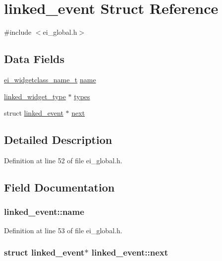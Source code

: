 \hypertarget{structlinked__event}{
\section{linked\_\-event Struct Reference}
\label{structlinked__event}
}


{\ttfamily \#include $<$ei\_\-global.h$>$}\subsection*{Data Fields}
\begin{DoxyCompactItemize}
\item 
\hyperlink{ei__widgetclass_8h_acfa18ebbfac8cbbc11345a01c2099aed}{ei\_\-widgetclass\_\-name\_\-t} \hyperlink{structlinked__event_ab7d51453c09d34e54477daf1b22754c5}{name}
\item 
\hyperlink{structlinked__widget__type}{linked\_\-widget\_\-type} $\ast$ \hyperlink{structlinked__event_a547d0483e1a92773dcd491feaefbce41}{types}
\item 
struct \hyperlink{structlinked__event}{linked\_\-event} $\ast$ \hyperlink{structlinked__event_a522470be59398afc724b678df939b88a}{next}
\end{DoxyCompactItemize}


\subsection{Detailed Description}


Definition at line 52 of file ei\_\-global.h.

\subsection{Field Documentation}
\hypertarget{structlinked__event_ab7d51453c09d34e54477daf1b22754c5}{
\subsubsection[{name}]{ {\bf linked\_\-event::name}}}
\label{structlinked__event_ab7d51453c09d34e54477daf1b22754c5}


Definition at line 53 of file ei\_\-global.h.\hypertarget{structlinked__event_a522470be59398afc724b678df939b88a}{
\subsubsection[{next}]{\setlength{\rightskip}{0pt plus 5cm}struct {\bf linked\_\-event}$\ast$ {\bf linked\_\-event::next}}}
\label{structlinked__event_a522470be59398afc724b678df939b88a}


